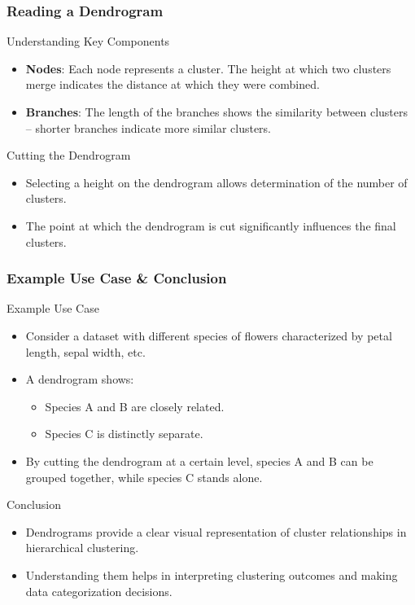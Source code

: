 \documentclass{beamer}
\begin{document}
\begin{frame}[fragile]
    \frametitle{Reading a Dendrogram}
    \begin{block}{Understanding Key Components}
        \begin{itemize}
            \item \textbf{Nodes}: Each node represents a cluster. The height at which two clusters merge indicates the distance at which they were combined.
            \item \textbf{Branches}: The length of the branches shows the similarity between clusters – shorter branches indicate more similar clusters.
        \end{itemize}
    \end{block}

    \begin{block}{Cutting the Dendrogram}
        \begin{itemize}
            \item Selecting a height on the dendrogram allows determination of the number of clusters.
            \item The point at which the dendrogram is cut significantly influences the final clusters.
        \end{itemize}
    \end{block}
\end{frame}

\begin{frame}[fragile]
    \frametitle{Example Use Case & Conclusion}
    \begin{block}{Example Use Case}
        \begin{itemize}
            \item Consider a dataset with different species of flowers characterized by petal length, sepal width, etc.
            \item A dendrogram shows:
                \begin{itemize}
                    \item Species A and B are closely related.
                    \item Species C is distinctly separate.
                \end{itemize}
            \item By cutting the dendrogram at a certain level, species A and B can be grouped together, while species C stands alone.
        \end{itemize}
    \end{block}

    \begin{block}{Conclusion}
        \begin{itemize}
            \item Dendrograms provide a clear visual representation of cluster relationships in hierarchical clustering.
            \item Understanding them helps in interpreting clustering outcomes and making data categorization decisions.
        \end{itemize}
    \end{block}
\end{frame}
\end{document}
